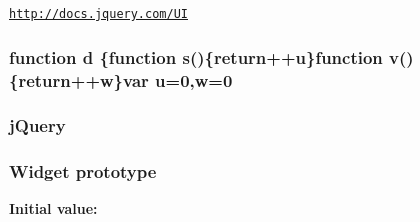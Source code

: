 \href{http://docs.jquery.com/UI}{\tt http\+://docs.\+jquery.\+com/\+U\+I} \hypertarget{jquery-ui-tabs_8js_a36541169dfff685f807208881a4f0021}{
\subsubsection[{d}]{\setlength{\rightskip}{0pt plus 5cm}function d \{function {\bf s}()\{return++u\}function {\bf v}()\{return++w\}var u=0,w=0}}\label{jquery-ui-tabs_8js_a36541169dfff685f807208881a4f0021}
\hypertarget{jquery-ui-tabs_8js_a2b1d6f9c448e3ce72f4e1865d6e38d2c}{
\subsubsection[{j\+Query}]{\setlength{\rightskip}{0pt plus 5cm}j\+Query}}\label{jquery-ui-tabs_8js_a2b1d6f9c448e3ce72f4e1865d6e38d2c}
\hypertarget{jquery-ui-tabs_8js_a27300e4442d1d6583d40af9f4aba4716}{
\subsubsection[{prototype}]{ {\bf Widget} prototype}}\label{jquery-ui-tabs_8js_a27300e4442d1d6583d40af9f4aba4716}
{\bfseries Initial value\+:}
